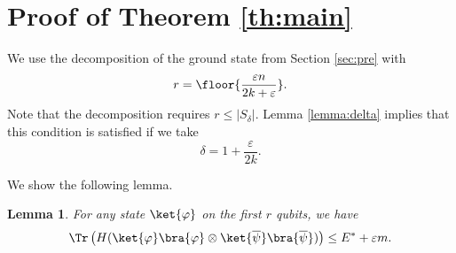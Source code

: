 \documentclass[11pt,a4paper]{article}
\theoremstyle{plain}
\newtheorem{lemma}{Lemma}
\theoremstyle{definition}
\begin{document}
\section{Proof of Theorem \ref{th:main}}
We use the decomposition of the ground state from Section \ref{sec:pre} with 
\[
r=\floor{\frac{\varepsilon n}{2k+\varepsilon}}.
\] 
Note that the decomposition requires $r\le |S_\delta|$. Lemma \ref{lemma:delta} implies that this condition is satisfied if we take
\[
\delta = 1+\frac{\varepsilon}{2k}.
\]

We show the following lemma.
\begin{lemma}\label{lemma:main}
For any state $\ket{\varphi}$ on the first $r$ qubits, we have
\[
\Tr\left(H(\ket{\varphi}\bra{\varphi}\otimes \ket{\overline{\psi}}\bra{\overline{\psi}})\right)
\le E^\ast+\varepsilon m.
\]
\end{lemma}
\end{document}
